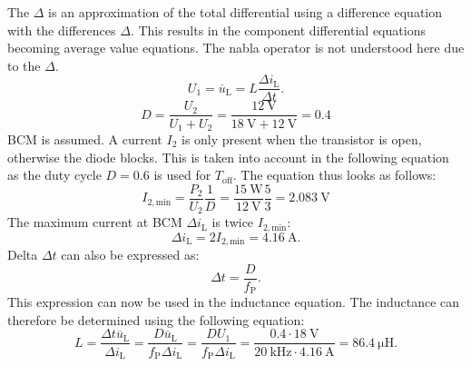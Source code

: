 \begin{solutionblock}
The $\Delta$ is an approximation of the total differential using a difference equation with the differences $\Delta$. This results in the component differential equations becoming average value equations. The nabla operator is not understood here due to the $\Delta$.
    \begin{equation}
        U_{\mathrm{1}} = \overline u_{\mathrm{L}} = L \frac{\Delta i_{\mathrm{L}} }{\Delta t}. 
    \end{equation}
\begin{equation}
    D = \frac{U_\mathrm{2}}{U_\mathrm{1}+U_\mathrm{2}} = \frac{\SI{12}{\volt}}{\SI{18}{\volt}+\SI{12}{\volt}} = 0.4
\end{equation}
BCM is assumed. A current $I_\mathrm{2}$ is only present when the transistor is open, otherwise the diode blocks. This is taken into account in the following equation as the duty cycle $D = 0.6$ is used for $T_\mathrm{off}$. The equation thus looks as follows:
\begin{equation}
    I_\mathrm{2,min} = \frac{P_\mathrm{2}}{U_\mathrm{2}} \frac{1}{D}=\frac{\SI{15}{\watt}}{\SI{12}{\volt}}\frac{5}{3}=\SI{2.083}{\volt}
\end{equation}
The maximum current at BCM $\Delta i_{\mathrm{L}}$ is twice  $I_\mathrm{2,min}$:
\begin{equation}
    \Delta i_{\mathrm{L}} = 2  I_\mathrm{2,min} = \SI{4.16}{\ampere}.
\end{equation}
Delta $\Delta t$ can also be expressed as:
\begin{equation}
    \Delta t = \frac{D}{f_\mathrm{P}}.
\end{equation}
This expression can now be used in the inductance equation. The inductance can therefore be determined using the following equation:
\begin{equation}
    L = \frac{\Delta t  \overline u_{\mathrm{L}}}{\Delta i_{\mathrm{L}}}= \frac{D \overline u_{\mathrm{L}}}{f_\mathrm{P}\Delta i_{\mathrm{L}}}= \frac{D U_{\mathrm{1}}}{f_\mathrm{P}\Delta i_{\mathrm{L}}} = \frac{0.4 \cdot \SI{18}{\volt}}{\SI{20}{\kilo\hertz}\cdot \SI{4.16}{\ampere }} = \SI{86.4}{\micro\henry}.
\end{equation}

\end{solutionblock}

